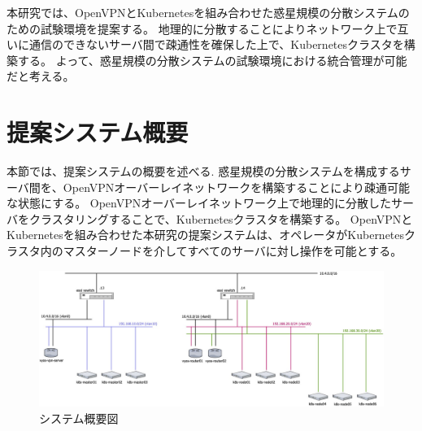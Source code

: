 本研究では、OpenVPNとKubernetesを組み合わせた惑星規模の分散システムのための試験環境を提案する。
地理的に分散することによりネットワーク上で互いに通信のできないサーバ間で疎通性を確保した上で、Kubernetesクラスタを構築する。
よって、惑星規模の分散システムの試験環境における統合管理が可能だと考える。

\section{提案システム概要}
\label{issue:about-system}

本節では、提案システムの概要を述べる.
惑星規模の分散システムを構成するサーバ間を、OpenVPNオーバーレイネットワークを構築することにより疎通可能な状態にする。
OpenVPNオーバーレイネットワーク上で地理的に分散したサーバをクラスタリングすることで、Kubernetesクラスタを構築する。
OpenVPNとKubernetesを組み合わせた本研究の提案システムは、オペレータがKubernetesクラスタ内のマスターノードを介してすべてのサーバに対し操作を可能とする。

\begin{figure}[htbp]
  \begin{center}
    \includegraphics[width=\textwidth]{./figures/system-diagram.jpg}
    \caption{システム概要図}
  \end{center}
\end{figure}

